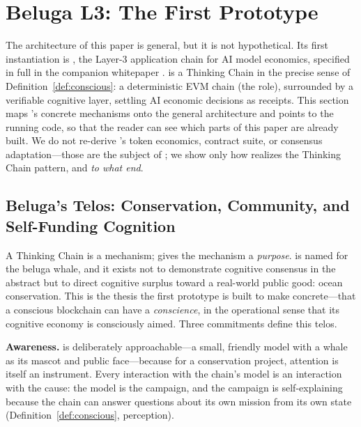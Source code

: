 \section{Beluga L3: The First Prototype}
\label{sec:beluga}

The architecture of this paper is general, but it is not hypothetical. Its first instantiation is \Beluga{}, the \Zoo{} Layer-3 application chain for AI model economics, specified in full in the companion \Beluga{} whitepaper \cite{zoo-beluga}. \Beluga{} is a Thinking Chain in the precise sense of Definition~\ref{def:conscious}: a deterministic EVM chain (the \CChain{} role), surrounded by a verifiable cognitive layer, settling AI economic decisions as receipts. This section maps \Beluga{}'s concrete mechanisms onto the general architecture and points to the running code, so that the reader can see which parts of this paper are already built. We do not re-derive \Beluga{}'s token economics, contract suite, or consensus adaptation---those are the subject of \cite{zoo-beluga}; we show only how \Beluga{} realizes the Thinking Chain pattern, and \emph{to what end}.

\subsection{Beluga's Telos: Conservation, Community, and Self-Funding Cognition}
\label{sec:beluga-telos}

A Thinking Chain is a mechanism; \Beluga{} gives the mechanism a \emph{purpose}. \Beluga{} is named for the beluga whale, and it exists not to demonstrate cognitive consensus in the abstract but to direct cognitive surplus toward a real-world public good: ocean conservation. This is the thesis the first prototype is built to make concrete---that a conscious blockchain can have a \emph{conscience}, in the operational sense that its cognitive economy is consciously aimed. Three commitments define this telos.

\textbf{Awareness.} \Beluga{} is deliberately approachable---a small, friendly model with a whale as its mascot and public face---because for a conservation project, attention is itself an instrument. Every interaction with the chain's model is an interaction with the cause: the model is the campaign, and the campaign is self-explaining because the chain can answer questions about its own mission from its own state (Definition~\ref{def:conscious}, perception).

